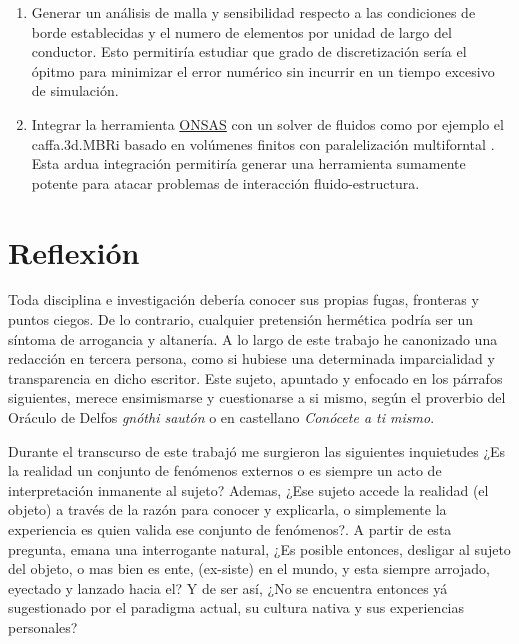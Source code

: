 \begin{enumerate}
	\item Generar un análisis de malla y sensibilidad respecto a las condiciones de borde establecidas y el numero de elementos por unidad de largo del conductor. Esto permitiría estudiar que grado de discretización sería el ópitmo para minimizar el error numérico sin incurrir en un tiempo excesivo de simulación. 
	\item Integrar la herramienta \href{https://github.com/ONSAS/ONSAS/}{ONSAS} con un solver de fluidos como por ejemplo el caffa.3d.MBRi basado en volúmenes finitos con paralelización multiforntal \cite{mendina2014general}. Esta ardua integración permitiría generar una herramienta sumamente potente para atacar problemas de interacción fluido-estructura.	
\end{enumerate}

\section{Reflexión}

Toda disciplina e investigación debería conocer sus propias fugas, fronteras y puntos ciegos. De lo contrario, cualquier pretensión hermética podría ser un síntoma de arrogancia y altanería.  A lo largo de este trabajo he canonizado una redacción en tercera persona, como si hubiese una determinada imparcialidad y transparencia en dicho escritor. Este sujeto, apuntado y enfocado en los párrafos siguientes, merece ensimismarse y cuestionarse a si mismo, según el proverbio del Oráculo de Delfos \emph{gnóthi sautón} o en castellano  \emph{Conócete a ti mismo}.

Durante el transcurso de este trabajó me surgieron las siguientes inquietudes ¿Es la realidad un conjunto de fenómenos externos o es siempre un acto de interpretación inmanente al sujeto? Ademas, ¿Ese sujeto accede la realidad (el objeto) a través de la razón para conocer y explicarla, o simplemente la experiencia es quien valida ese conjunto de fenómenos?. A partir de esta pregunta, emana una interrogante natural, ¿Es posible entonces, desligar al sujeto del objeto, o mas bien es ente,  (ex-siste) en el mundo, y esta siempre arrojado, eyectado y lanzado hacia el? Y de ser así, ¿No se encuentra entonces  yá sugestionado por el paradigma actual, su cultura nativa y sus experiencias personales?


